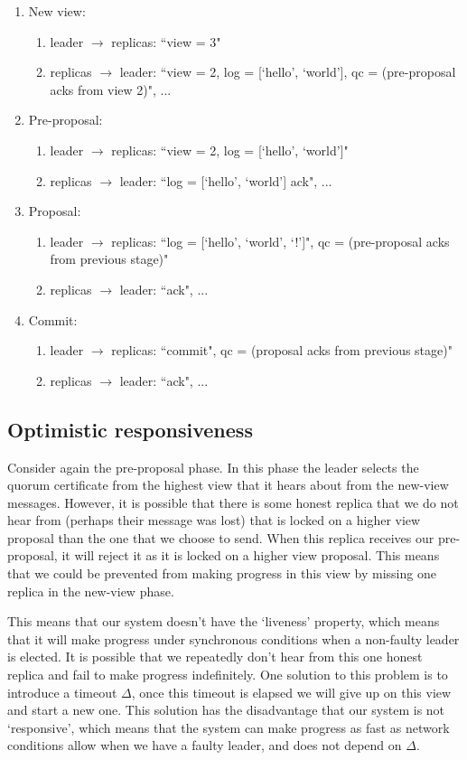 \begin{enumerate}
\item New view: 
	\begin{enumerate}
	\item leader $\to$ replicas: ``view = 3" 
	\item replicas $\to$ leader: ``view = 2, log = [`hello', `world'], qc = (pre-proposal acks from view 2)", ...
	\end{enumerate}
\item Pre-proposal:
	\begin{enumerate}
	\item leader $\to$ replicas: ``view = 2, log = [`hello', `world']"
	\item replicas $\to$ leader: ``log = [`hello', `world'] ack", ...
	\end{enumerate}
\item Proposal:
	\begin{enumerate}
	\item leader $\to$ replicas: ``log = [`hello', `world', `!']", qc = (pre-proposal acks from previous stage)"
	\item replicas $\to$ leader: ``ack", ...
	\end{enumerate}
\item Commit:
	\begin{enumerate}
	\item leader $\to$ replicas: ``commit", qc = (proposal acks from previous stage)"
	\item replicas $\to$ leader: ``ack", ...
	\end{enumerate}
\end{enumerate}
\subsection{Optimistic responsiveness}
Consider again the pre-proposal phase. In this phase the leader selects the quorum certificate from the highest view that it hears about from the new-view messages. However, it is possible that there is some honest replica that we do not hear from (perhaps their message was lost) that is locked on a higher view proposal than the one that we choose to send. When this replica receives our pre-proposal, it will reject it as it is locked on a higher view proposal. This means that we could be prevented from making progress in this view by missing one replica in the new-view phase.

This means that our system doesn't have the `liveness' property, which means that it will make progress under synchronous conditions when a non-faulty leader is elected. It is possible that we repeatedly don't hear from this one honest replica and fail to make progress indefinitely. One solution to this problem is to introduce a timeout $\Delta$, once this timeout is elapsed we will give up on this view and start a new one. This solution has the disadvantage that our system is not `responsive', which means that the system can make progress as fast as network conditions allow when we have a faulty leader, and does not depend on $\Delta$.

